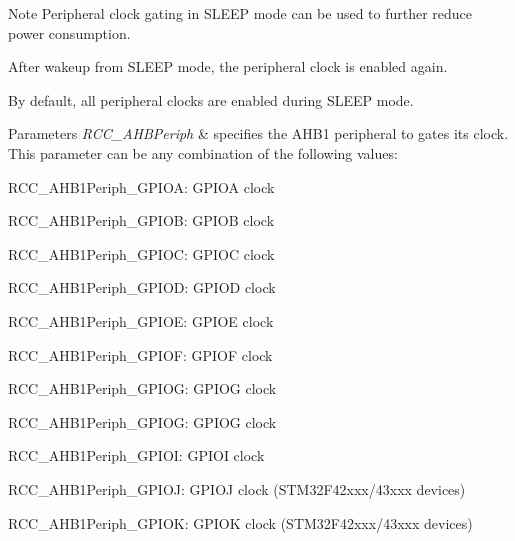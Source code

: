\begin{DoxyNote}{Note}
Peripheral clock gating in S\+L\+E\+EP mode can be used to further reduce power consumption. 

After wakeup from S\+L\+E\+EP mode, the peripheral clock is enabled again. 

By default, all peripheral clocks are enabled during S\+L\+E\+EP mode. 
\end{DoxyNote}

\begin{DoxyParams}{Parameters}
{\em R\+C\+C\+\_\+\+A\+H\+B\+Periph} & specifies the A\+H\+B1 peripheral to gates its clock. This parameter can be any combination of the following values\+: \begin{DoxyItemize}
\item R\+C\+C\+\_\+\+A\+H\+B1\+Periph\+\_\+\+G\+P\+I\+OA\+: G\+P\+I\+OA clock \item R\+C\+C\+\_\+\+A\+H\+B1\+Periph\+\_\+\+G\+P\+I\+OB\+: G\+P\+I\+OB clock \item R\+C\+C\+\_\+\+A\+H\+B1\+Periph\+\_\+\+G\+P\+I\+OC\+: G\+P\+I\+OC clock \item R\+C\+C\+\_\+\+A\+H\+B1\+Periph\+\_\+\+G\+P\+I\+OD\+: G\+P\+I\+OD clock \item R\+C\+C\+\_\+\+A\+H\+B1\+Periph\+\_\+\+G\+P\+I\+OE\+: G\+P\+I\+OE clock \item R\+C\+C\+\_\+\+A\+H\+B1\+Periph\+\_\+\+G\+P\+I\+OF\+: G\+P\+I\+OF clock \item R\+C\+C\+\_\+\+A\+H\+B1\+Periph\+\_\+\+G\+P\+I\+OG\+: G\+P\+I\+OG clock \item R\+C\+C\+\_\+\+A\+H\+B1\+Periph\+\_\+\+G\+P\+I\+OG\+: G\+P\+I\+OG clock \item R\+C\+C\+\_\+\+A\+H\+B1\+Periph\+\_\+\+G\+P\+I\+OI\+: G\+P\+I\+OI clock \item R\+C\+C\+\_\+\+A\+H\+B1\+Periph\+\_\+\+G\+P\+I\+OJ\+: G\+P\+I\+OJ clock (S\+T\+M32\+F42xxx/43xxx devices) \item R\+C\+C\+\_\+\+A\+H\+B1\+Periph\+\_\+\+G\+P\+I\+OK\+: G\+P\+I\+OK clock (S\+T\+M32\+F42xxx/43xxx devices) ~\newline

\end{DoxyItemize}
\end{DoxyParams}
